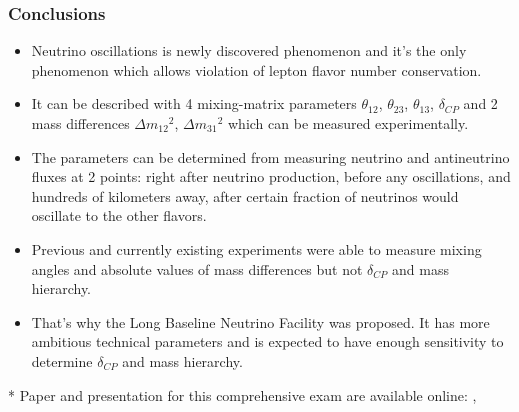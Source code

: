 \documentclass{beamer}
\begin{document}
\begin{frame}\frametitle{Conclusions}
  \scriptsize
  \begin{itemize}
     \item Neutrino oscillations is newly discovered phenomenon and it's the only phenomenon which allows violation of lepton flavor number conservation.
     \item It can be described with 4 mixing-matrix parameters $\theta_{12}$, $\theta_{23}$, $\theta_{13}$, $\delta_{CP}$ and 2 mass differences $\Delta{m_{12}}^2$, $\Delta{m_{31}}^2$ which can be measured experimentally.
     \item The parameters can be determined from measuring neutrino and antineutrino fluxes at 2 points: right after neutrino production, before any oscillations, and hundreds of kilometers away, after certain fraction of neutrinos would oscillate to the other flavors. 
     \item Previous and currently existing experiments were able to measure mixing angles and absolute values of mass differences but not $\delta_{CP}$ and mass hierarchy. 
     \item That's why the Long Baseline Neutrino Facility was proposed. It has more ambitious technical parameters and is expected to have enough sensitivity to determine $\delta_{CP}$ and mass hierarchy.
  \end{itemize}
  \tiny
  * Paper and presentation for this comprehensive exam are available online: \cite{ref_my_paper}, \cite{ref_my_presentation}
\end{frame}



\end{document}

